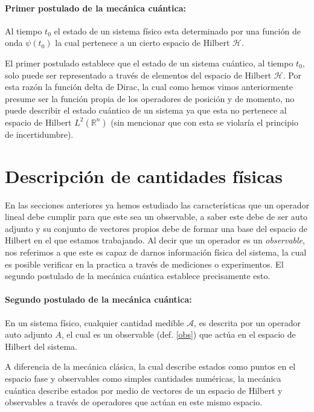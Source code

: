 \documentclass[12pt]{book}
\numberwithin{equation}{chapter}
\def\R{\mathbb{R}}
\def\H{\mathcal{H}}
\begin{document}
\paragraph{Primer postulado de la mec\'anica cu\'antica:} Al tiempo $t_{0}$ el estado de un sistema f\'isico esta determinado por una funci\'on de onda $\psi(t_{0})$ la cual pertenece a un cierto espacio de Hilbert $\H$.
\rightline{$\dag$}
\vspace{3 mm} 

El primer postulado establece que el estado de un sistema cu\'antico, al tiempo $t_{0}$, solo puede ser representado a trav\'es de elementos del espacio de Hilbert $\H$. Por esta raz\'on la funci\'on delta de Dirac, la cual como hemos vimos anteriormente presume ser la funci\'on propia de los operadores de posici\'on y de momento, no puede describir el estado cu\'antico de un sistema ya que esta no pertenece al espacio de Hilbert $L^{2}(\R^{n})$ (sin mencionar que con esta se violar\'ia el principio de incertidumbre).

\section{Descripci\'on de cantidades f\'isicas}
En las secciones anteriores ya hemos estudiado las caracter\'isticas que un operador lineal debe cumplir para que este sea un observable, a saber este debe de ser auto adjunto y su conjunto de vectores propios debe de formar una base del espacio de Hilbert en el que estamos trabajando. Al decir que un operador es un \emph{observable}, nos referimos a que este es capaz de darnos informaci\'on f\'isica del sistema, la cual es posible verificar en la practica a trav\'es de mediciones o experimentos. El segundo postulado de la mec\'anica cu\'antica establece precisamente esto.\\

\paragraph{Segundo postulado de la mec\'anica cu\'antica:} En un sistema f\'isico, cualquier cantidad medible $\mathcal{A}$, es descrita por un operador auto adjunto $A$, el cual es un observable (def. \ref{obs}) que act\'ua en el espacio de Hilbert del sistema.
\rightline{$\dag$}
\vspace{3 mm}

A diferencia de la mec\'anica cl\'asica, la cual describe estados como puntos en el espacio fase y observables como simples cantidades num\'ericas, la mec\'anica cu\'antica describe estados por medio de vectores de un espacio de Hilbert y observables a trav\'es de operadores que act\'uan en este mismo espacio.
\end{document}
